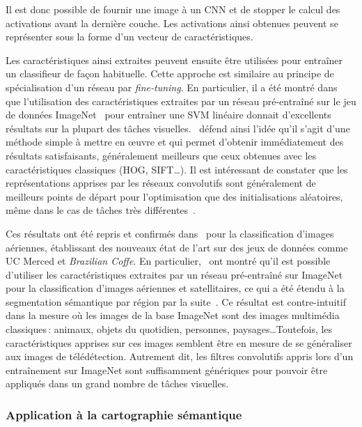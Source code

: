 Il est donc possible de fournir une image à un \gls{CNN} et de stopper le calcul des activations avant la dernière couche. Les activations ainsi obtenues peuvent se représenter sous la forme d'un vecteur de caractéristiques.

Les caractéristiques ainsi extraites peuvent ensuite être utilisées pour entraîner un classifieur de façon habituelle. Cette approche est similaire au principe de spécialisation d'un réseau par \emph{fine-tuning}. En particulier, il a été montré dans~\cite{razavian_cnn_2014} que l'utilisation des caractéristiques extraites par un réseau pré-entraîné sur le jeu de données ImageNet~\cite{deng_imagenet:_2009} pour entraîner une \gls{SVM} linéaire donnait d'excellents résultats sur la plupart des tâches visuelles.~\cite{razavian_cnn_2014} défend ainsi l'idée qu'il s'agit d'une méthode simple à mettre en \oe{}uvre et qui permet d'obtenir immédiatement des résultats satisfaisants, généralement meilleurs que ceux obtenues avec les caractéristiques classiques (\gls{HOG}, \gls{SIFT}\dots). Il est intéressant de constater que les représentations apprises par les réseaux convolutifs sont généralement de meilleurs points de départ pour l'optimisation que des initialisations aléatoires, même dans le cas de tâches très différentes~\cite{yosinski_how_2014}.

Ces résultats ont été repris et confirmés dans~\cite{penatti_deep_2015,marmanis_deep_2016,lagrange_benchmarking_2015} pour la classification d'images aériennes, établissant des nouveaux état de l'art sur des jeux de données comme UC Merced et \emph{Brazilian Coffe}. En particulier,~\cite{marmanis_deep_2016,penatti_deep_2015} ont montré  qu'il est possible d'utiliser les caractéristiques extraites par un réseau pré-entraîné sur ImageNet pour la classification d'images aériennes et satellitaires, ce qui a été étendu à la segmentation sémantique par région par la suite~\cite{lagrange_benchmarking_2015}. Ce résultat est contre-intuitif dans la mesure où les images de la base ImageNet sont des images multimédia classiques\,: animaux, objets du quotidien, personnes, paysages\dots Toutefois, les caractéristiques apprises sur ces images semblent être en mesure de se généraliser aux images de télédétection. Autrement dit, les filtres convolutifs appris lors d'un entraînement sur ImageNet sont suffisamment génériques pour pouvoir être appliqués dans un grand nombre de tâches visuelles.

\subsubsection{Application à la cartographie sémantique}

